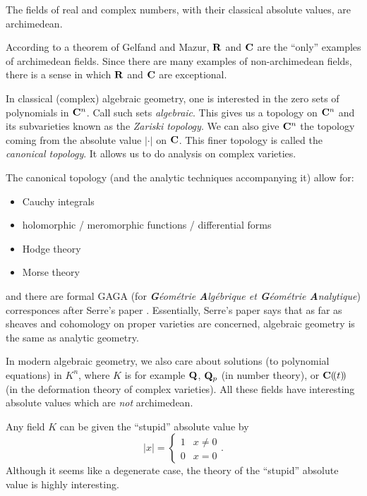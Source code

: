 \begin{example_}
The fields of real and complex numbers, with their classical absolute 
values, are archimedean.
\end{example_}

According to a theorem of Gelfand and Mazur, $\mathbf{R}$ and $\mathbf{C}$ are the ``only'' 
examples of archimedean fields. Since there are many examples of 
non-archimedean fields, there is a sense in which $\mathbf{R}$ and $\mathbf{C}$ are 
exceptional. 

\begin{example_}
In classical (complex) algebraic geometry, one is interested in the zero sets 
of polynomials in $\mathbf{C}^n$. Call such sets \emph{algebraic}. This gives us a 
topology on $\mathbf{C}^n$ and its subvarieties known as the \emph{Zariski topology}. 
We can also give $\mathbf{C}^n$ the topology coming from the absolute value $|\cdot|$ 
on $\mathbf{C}$. This finer topology is called the \emph{canonical topology}. It 
allows us to do analysis on complex varieties. 
\end{example_}

The canonical topology (and the analytic techniques accompanying it) allow for: 
\begin{itemize}
  \item Cauchy integrals
  \item holomorphic / meromorphic functions / differential forms
  \item Hodge theory
  \item Morse theory
\end{itemize}
and there are formal GAGA (for \emph{\textbf{G}\'eom\'etrie \textbf{A}lg\'ebrique et \textbf{G}\'eom\'etrie 
\textbf{A}nalytique}) corresponces after Serre's paper \cite{serre-1956}. Essentially, Serre's 
paper says that as far as sheaves and cohomology on proper varieties are 
concerned, algebraic geometry is the same as analytic geometry. 

In modern algebraic geometry, we also care about solutions (to polynomial 
equations) in $K^n$, where $K$ is for example $\mathbf{Q}$, $\mathbf{Q}_p$ (in number 
theory), or $\mathbf{C}(\!( t)\!)$ (in the deformation theory of complex varieties). 
All these fields have interesting absolute values which are \emph{not} 
archimedean.

\begin{example_}
Any field $K$ can be given the ``stupid'' absolute value by 
\[
  |x| = \begin{cases} 1 & x\ne 0 \\ 0 & x=0 \end{cases} .
\]
Although it seems like a degenerate case, the theory of the ``stupid'' 
absolute value is highly interesting. 
\end{example_}

